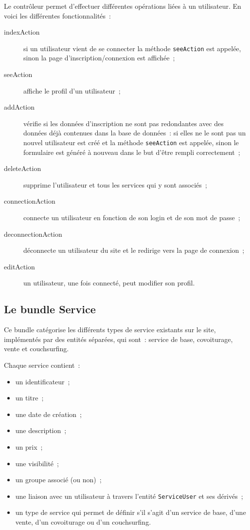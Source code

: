 Le contrôleur permet d'effectuer différentes opérations liées à un utilisateur. En voici les différentes fonctionnalités~:
\begin{description}
    \item [indexAction] si un utilisateur vient de se connecter la méthode \verb|seeAction| est appelée, sinon la page d'inscription/connexion est affichée~;
    \item [seeAction] affiche le profil d'un utilisateur~;
    \item [addAction] vérifie si les données d'inscription ne sont pas redondantes avec des données déjà contenues dans la base de données~: si elles ne le sont pas un nouvel utilisateur est créé et la méthode \verb|seeAction| est appelée, sinon le formulaire est généré à nouveau dans le but d'être rempli correctement~;
    \item [deleteAction] supprime l'utilisateur et tous les services qui y sont associés~;
    \item [connectionAction] connecte un utilisateur en fonction de son login et de son mot de passe~;
    \item [deconnectionAction] déconnecte un utilisateur du site et le redirige vers la page de connexion~;
    \item [editAction] un utilisateur, une fois connecté, peut modifier son profil.
\end{description}

\subsection{Le bundle Service}

Ce bundle catégorise les différents types de service existants sur le site, implémentés par des entités séparées, qui sont~: service de base, covoiturage, vente et couchsurfing.

Chaque service contient~:
\begin{itemize}
    \item un identificateur~;
    \item un titre~;
    \item une date de création~;
    \item une description~;
    \item un prix~;
    \item une visibilité~;
    \item un groupe associé (ou non)~;
    \item une liaison avec un utilisateur à travers l'entité \verb|ServiceUser| et ses dérivés~;
    \item un type de service qui permet de définir s'il s'agit d'un service de base, d'une vente, d'un covoiturage ou d'un couchsurfing.
\end{itemize}

